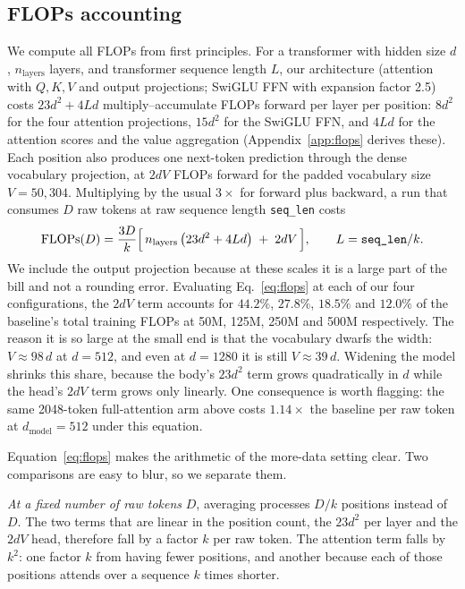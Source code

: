 \documentclass[11pt]{article}
\newcommand{\Ltr}{L}            %
\newcommand{\dmodel}{d_{\mathrm{model}}}
\begin{document}
\subsection{FLOPs accounting}
\label{sec:flops}

We compute all FLOPs from first principles. For a transformer with hidden
size $d$, $n_{\mathrm{layers}}$ layers, and transformer sequence length
$\Ltr$, our architecture (attention with $Q,K,V$ and output projections;
SwiGLU FFN with expansion factor 2.5) costs $23d^2 + 4\Ltr d$
multiply--accumulate FLOPs forward per layer per position: $8d^2$ for the four
attention projections, $15d^2$ for the SwiGLU FFN, and $4\Ltr d$ for the
attention scores and the value aggregation
(Appendix~\ref{app:flops} derives these). Each position also produces one
next-token prediction through the dense vocabulary projection, at $2dV$ FLOPs
forward for the padded vocabulary size $V = 50{,}304$. Multiplying by the
usual $3\times$ for forward plus backward, a run that consumes $D$ raw tokens
at raw sequence length \texttt{seq\_len} costs
\begin{equation}
\mathrm{FLOPs}(D)
= \frac{3D}{k}
  \Bigl[\, n_{\mathrm{layers}} \left( 23 d^2 + 4 \Ltr d \right)
        \;+\; 2 d V \,\Bigr],
\qquad \Ltr = \texttt{seq\_len}/k .
\label{eq:flops}
\end{equation}
We include the output projection because at these scales it is a large part
of the bill and not a rounding error. Evaluating Eq.~\eqref{eq:flops} at each
of our four configurations, the $2dV$ term accounts for $44.2\%$, $27.8\%$,
$18.5\%$ and $12.0\%$ of the baseline's total training FLOPs at 50M, 125M,
250M and 500M respectively. The reason it is so large at the small end is
that the vocabulary dwarfs the width: $V \approx 98\,d$ at $d = 512$, and even
at $d = 1280$ it is still $V \approx 39\,d$. Widening the model shrinks this
share, because the body's $23d^2$ term grows quadratically in $d$ while the
head's $2dV$ term grows only linearly. One consequence is worth flagging: the
same 2048-token full-attention arm above costs $1.14\times$ the baseline per
raw token at $\dmodel{=}512$ under this equation.

Equation~\eqref{eq:flops} makes the arithmetic of the more-data setting
clear. Two comparisons are easy to blur, so we separate them.

\emph{At a fixed number of raw tokens} $D$, averaging processes $D/k$
positions instead of $D$. The two terms that are linear in the position
count, the $23d^2$ per layer and the $2dV$ head, therefore fall by a factor
$k$ per raw token. The attention term falls by $k^2$: one factor $k$ from
having fewer positions, and another because each of those positions attends
over a sequence $k$ times shorter.
\end{document}
